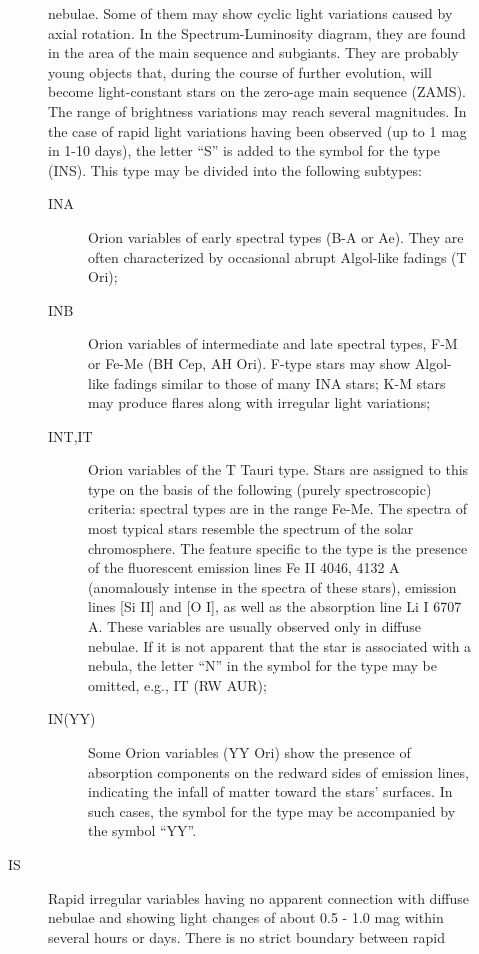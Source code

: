 \begin{description}
\begin{description}
				nebulae. Some of them may show cyclic light variations caused by axial
				rotation. In the Spectrum-Luminosity diagram, they are found in the area
				of the main sequence and subgiants. They are probably young objects
				that, during the course of further evolution, will become light-constant
				stars on the zero-age main sequence (ZAMS). The range of brightness
				variations may reach several magnitudes. In the case of rapid light
				variations having been observed (up to 1 mag in 1-10 days), the letter
				``S'' is added to the symbol for the type (INS). This type may be
				divided into the following subtypes:
		\begin{description}
\item[INA]		Orion variables of early spectral types (B-A or Ae). They
				are often characterized by occasional abrupt Algol-like fadings (T Ori);
\item[INB]		Orion variables of intermediate and late spectral types,
				F-M or Fe-Me (BH Cep, AH Ori). F-type stars may show Algol-like fadings
				similar to those of many INA stars; K-M stars may produce flares along
				with irregular light variations;
\item[INT,IT] 	Orion variables of the T Tauri type. Stars are assigned
				to this type on the basis of the following (purely spectroscopic)
				criteria: spectral types are in the range Fe-Me. The spectra of most
				typical stars resemble the spectrum of the solar chromosphere. The
				feature specific to the type is the presence of the fluorescent emission
				lines Fe II 4046, 4132 A (anomalously intense in the spectra of these
				stars), emission lines {[}Si II{]} and {[}O I{]}, as well as the
				absorption line Li I 6707 A. These variables are usually observed only
				in diffuse nebulae. If it is not apparent that the star is associated
				with a nebula, the letter ``N'' in the symbol for the type may be
				omitted, e.g., IT (RW AUR);
\item[IN(YY)] 	Some Orion variables (YY Ori) show the presence of
				absorption components on the redward sides of emission lines, indicating
				the infall of matter toward the stars' surfaces. In such cases, the
				symbol for the type may be accompanied by the symbol
				``YY''.
		\end{description}
\item[IS]		Rapid irregular variables having no apparent connection
				with diffuse nebulae and showing light changes of about 0.5 - 1.0 mag
				within several hours or days. There is no strict boundary between rapid

\end{description}
\end{description}
